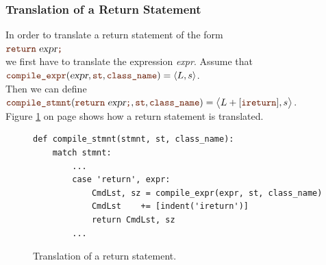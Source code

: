 \subsubsection{Translation of a Return Statement}
In order to translate a return statement of the form
\\[0.2cm]
\hspace*{1.3cm}
$\mytt{return}\; \textsl{expr} \mytt{;}$
\\[0.2cm]
we first have to translate the expression \textsl{expr}.  Assume that
\\[0.2cm]
\hspace*{1.3cm}
$\mytt{compile\_expr}(\textsl{expr}, \mytt{st}, \mytt{class\_name}) = \pair(L, s)$.
\\[0.2cm]
Then we can define
\\[0.2cm]\hspace*{1.3cm}
$\mytt{compile\_stmnt}(\mytt{return}\; \textsl{expr} \mytt{;}, \mytt{st}, \mytt{class\_name}) =
 \bigl\langle L + [\mytt{ireturn}], s \bigr\rangle$.
\\[0.2cm]
Figure \ref{fig:Compiler.ipynb:compile:return} on page \pageref{fig:Compiler.ipynb:compile:return} shows how a
return statement is translated.

\begin{figure}[!ht]
\centering
\begin{verbatim}
def compile_stmnt(stmnt, st, class_name):
    match stmnt:
        ...
        case 'return', expr:
            CmdLst, sz = compile_expr(expr, st, class_name)
            CmdLst    += [indent('ireturn')]
            return CmdLst, sz
        ...
\end{verbatim}
\vspace*{-0.3cm}
\caption{Translation of a return statement.}
\label{fig:Compiler.ipynb:compile:return}
\end{figure}

